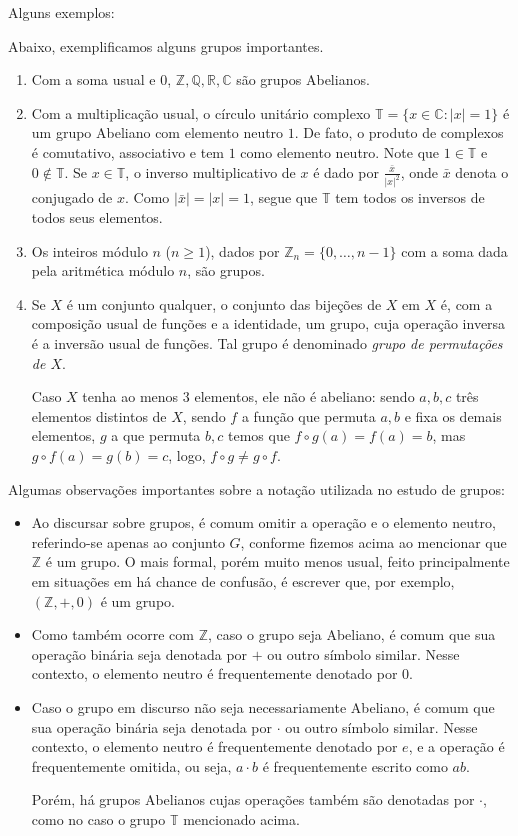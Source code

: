 Alguns exemplos:

\begin{exemplo}Abaixo, exemplificamos alguns grupos importantes.
    \begin{enumerate}[label=\alph*)]
        \item Com a soma usual e $0$, $\mathbb{Z, Q, R, C}$ são grupos Abelianos.
        \item Com a multiplicação usual, o círculo unitário complexo $\mathbb T=\{x \in \mathbb C: |x|=1\}$ é um grupo Abeliano com elemento neutro $1$.
        De fato, o produto de complexos é comutativo, associativo e tem $1$ como elemento neutro.
        Note que $1\in \mathbb T$ e $0\notin \mathbb T$.
        Se $x \in \mathbb T$, o inverso multiplicativo de $x$ é dado por $\frac{\bar x}{|x|^2}$, onde $\bar x$ denota o conjugado de $x$.
        Como $|\bar x|=|x|=1$, segue que $\mathbb T$ tem todos os inversos de todos seus elementos.
        \item Os inteiros módulo $n$ ($n\geq 1$), dados por $\mathbb Z_n=\{0, \dots, n-1\}$ com a soma dada pela aritmética módulo $n$, são grupos.
        \item Se $X$ é um conjunto qualquer, o conjunto das bijeções de $X$ em $X$ é, com a composição usual de funções e a identidade, um grupo, cuja operação inversa é a inversão usual de funções.
        Tal grupo é denominado \emph{grupo de permutações de $X$}.
        
        Caso $X$ tenha ao menos $3$ elementos, ele não é abeliano: sendo $a, b, c$ três elementos distintos de $X$, sendo $f$ a função que permuta $a, b$ e fixa os demais elementos, $g$ a que permuta $b, c$ temos que $f\circ g(a)=f(a)=b$, mas $g\circ f(a)=g(b)=c$, logo, $f\circ g\neq g\circ f$.
    \end{enumerate}
\end{exemplo}

Algumas observações importantes sobre a notação utilizada no estudo de grupos:
\begin{itemize}
\item Ao discursar sobre grupos, é comum omitir a operação e o elemento neutro, referindo-se apenas ao conjunto $G$, conforme fizemos acima ao mencionar que $\mathbb Z$ é um grupo.
O mais formal, porém muito menos usual, feito principalmente em situações em há chance de confusão, é escrever que, por exemplo, $(\mathbb Z, +, 0)$ é um grupo.
\item Como também ocorre com $\mathbb Z$, caso o grupo seja Abeliano, é comum que sua operação binária seja denotada por $+$ ou outro símbolo similar.
Nesse contexto, o elemento neutro é frequentemente denotado por $0$.
\item Caso o grupo em discurso não seja necessariamente Abeliano, é comum que sua operação binária seja denotada por $\cdot$ ou outro símbolo similar.
Nesse contexto, o elemento neutro é frequentemente denotado por $e$, e a operação é frequentemente omitida, ou seja, $a \cdot b$ é frequentemente escrito como $ab$.

Porém, há grupos Abelianos cujas operações também são denotadas por $\cdot$, como no caso o grupo $\mathbb T$ mencionado acima.
\end{itemize}


